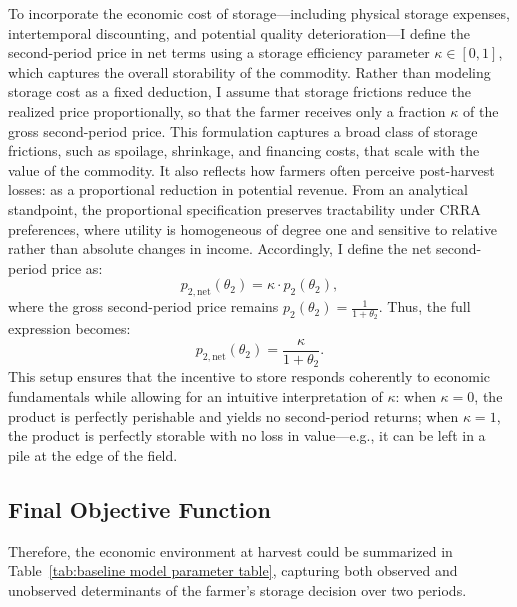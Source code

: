 To incorporate the economic cost of storage—including physical storage expenses, intertemporal discounting, and potential quality deterioration—I define the second-period price in net terms using a storage efficiency parameter $\kappa \in [0,1]$, which captures the overall storability of the commodity. Rather than modeling storage cost as a fixed deduction, I assume that storage frictions reduce the realized price proportionally, so that the farmer receives only a fraction $\kappa$ of the gross second-period price. This formulation captures a broad class of storage frictions, such as spoilage, shrinkage, and financing costs, that scale with the value of the commodity. It also reflects how farmers often perceive post-harvest losses: as a proportional reduction in potential revenue. From an analytical standpoint, the proportional specification preserves tractability under CRRA preferences, where utility is homogeneous of degree one and sensitive to relative rather than absolute changes in income. Accordingly, I define the net second-period price as:
$$
p_{2,\text{net}}(\theta_2) = \kappa \cdot p_2(\theta_2),
$$
where the gross second-period price remains $p_2(\theta_2) = \frac{1}{1 + \theta_2}$. Thus, the full expression becomes:
$$
p_{2,\text{net}}(\theta_2) = \frac{\kappa}{1 + \theta_2}.
$$
This setup ensures that the incentive to store responds coherently to economic fundamentals while allowing for an intuitive interpretation of $\kappa$: when $\kappa = 0$, the product is perfectly perishable and yields no second-period returns; when $\kappa = 1$, the product is perfectly storable with no loss in value—e.g., it can be left in a pile at the edge of the field.






\subsection{Final Objective Function}

\noindent Therefore, the economic environment at harvest could be summarized in Table~\ref{tab:baseline model parameter table}, capturing both observed and unobserved determinants of the farmer's storage decision over two periods.

